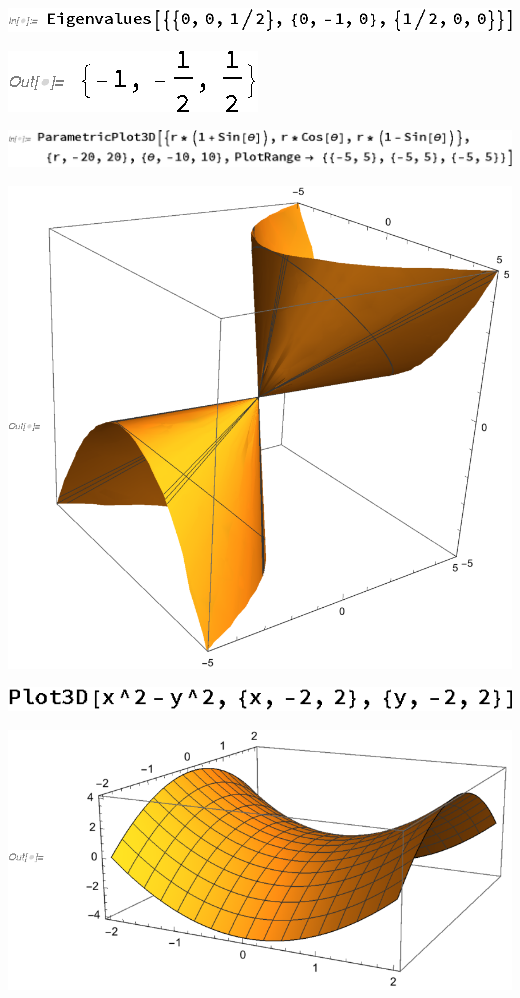 \documentclass{article}
\begin{document}
\includegraphics{gr_gr9.eps}

\includegraphics{gr_gr10.eps}

\includegraphics{gr_gr11.eps}

\includegraphics{gr_gr12.eps}

\includegraphics{gr_gr13.eps}

\includegraphics{gr_gr14.eps}
\end{document}
